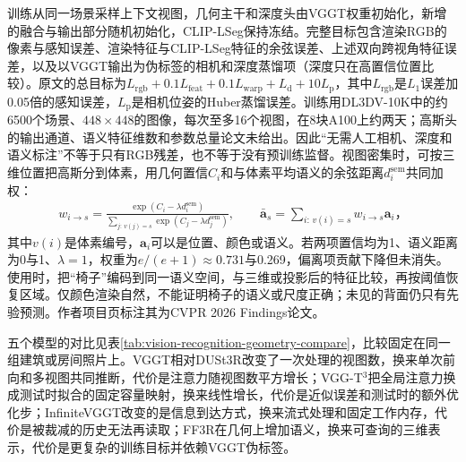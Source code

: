 训练从同一场景采样上下文视图，几何主干和深度头由VGGT权重初始化，新增的融合与输出部分随机初始化，CLIP-LSeg保持冻结。完整目标包含渲染RGB的像素与感知误差、渲染特征与CLIP-LSeg特征的余弦误差、上述双向跨视角特征误差，以及以VGGT输出为伪标签的相机和深度蒸馏项（深度只在高置信位置比较）。原文的总目标为$L_{\mathrm{rgb}}+0.1L_{\mathrm{feat}}+0.1L_{\mathrm{warp}}+L_{\mathrm d}+10L_{\mathrm p}$，其中$L_{\mathrm{rgb}}$是$L_1$误差加0.05倍的感知误差，$L_{\mathrm p}$是相机位姿的Huber蒸馏误差。训练用DL3DV-10K中的约6500个场景、$448\times448$的图像，每次至多16个视图，在8块A100上约两天；高斯头的输出通道、语义特征维数和参数总量论文未给出。因此“无需人工相机、深度和语义标注”不等于只有RGB残差，也不等于没有预训练监督。视图密集时，可按三维位置把高斯分到体素，用几何置信$C_i$和与体素平均语义的余弦距离$d_i^{\mathrm{sem}}$共同加权：
\begin{equation}
 \begin{aligned}
 w_{i\to s}=
 \frac{\exp(C_i-\lambda d_i^{\mathrm{sem}})}
 {\sum_{j:\,v(j)=s}\exp(C_j-\lambda d_j^{\mathrm{sem}})},\qquad
 \bar{\bm{a}}_s=\sum_{i:\,v(i)=s}w_{i\to s}\bm{a}_i\text{，}
 \end{aligned}
 \label{eq:vision-ff3r-voxel}
\end{equation}
其中$v(i)$是体素编号，$\bm{a}_i$可以是位置、颜色或语义。若两项置信均为1、语义距离为0与1、$\lambda=1$，权重为$e/(e+1)\approx0.731$与0.269，偏离项贡献下降但未消失。使用时，把“椅子”编码到同一语义空间，与三维或投影后的特征比较，再按阈值恢复区域。仅颜色渲染自然，不能证明椅子的语义或尺度正确；未见的背面仍只有先验预测。作者项目页标注其为CVPR 2026 Findings论文。

五个模型的对比见表\ref{tab:vision-recognition-geometry-compare}，比较固定在同一组建筑或房间照片上。VGGT相对DUSt3R改变了一次处理的视图数，换来单次前向和多视图共同推断，代价是注意力随视图数平方增长；VGG-T$^3$把全局注意力换成测试时拟合的固定容量映射，换来线性增长，代价是近似误差和测试时的额外优化步；InfiniteVGGT改变的是信息到达方式，换来流式处理和固定工作内存，代价是被裁减的历史无法再读取；FF3R在几何上增加语义，换来可查询的三维表示，代价是更复杂的训练目标并依赖VGGT伪标签。

